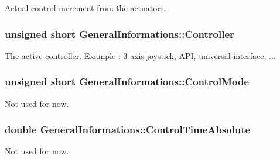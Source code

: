 Actual control increment from the actuators. 

\subsubsection[{\texorpdfstring{Controller}{Controller}}]{\setlength{\rightskip}{0pt plus 5cm}unsigned short General\+Informations\+::\+Controller}\hypertarget{struct_general_informations_a3cd5d14a57c053719db5c02cc471005b}{}\label{struct_general_informations_a3cd5d14a57c053719db5c02cc471005b}


The active controller. Example \+: 3-\/axis joystick, A\+PI, universal interface, ... 

\subsubsection[{\texorpdfstring{Control\+Mode}{ControlMode}}]{\setlength{\rightskip}{0pt plus 5cm}unsigned short General\+Informations\+::\+Control\+Mode}\hypertarget{struct_general_informations_aaac67e7cb72de84d904bf96285ce97ef}{}\label{struct_general_informations_aaac67e7cb72de84d904bf96285ce97ef}


Not used for now. 

\subsubsection[{\texorpdfstring{Control\+Time\+Absolute}{ControlTimeAbsolute}}]{\setlength{\rightskip}{0pt plus 5cm}double General\+Informations\+::\+Control\+Time\+Absolute}\hypertarget{struct_general_informations_a8f91e2c0ca1565c5f3478923b9885389}{}\label{struct_general_informations_a8f91e2c0ca1565c5f3478923b9885389}


Not used for now. 

